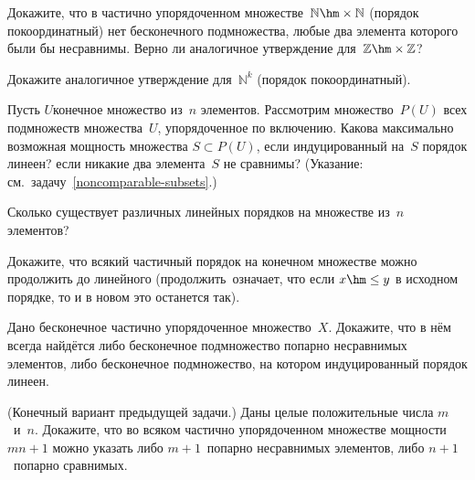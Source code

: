 \begin{problem}
Докажите, что в частично упорядоченном
множестве~$\mathbb{N}\hm\times\mathbb{N}$ (порядок покоординатный)
нет бесконечного
подмножества, любые два элемента
которого были бы несравнимы. Верно ли аналогичное
утверждение для~$\mathbb{Z}\hm\times\mathbb{Z}$?
\end{problem}

\begin{problem}
Докажите аналогичное утверждение для~$\mathbb{N}^k$ (порядок
покоординатный).
\end{problem}

\begin{problem}
Пусть $U$\т конечное множество из~$n$ элементов. Рассмотрим
множество~$P(U)$ всех подмножеств множества~$U$, упорядоченное
по включению. Какова максимально
возможная мощность множества $S\subset P(U)$, если
индуцированный на~$S$ порядок линеен? если никакие два
элемента~$S$ не сравнимы? (Указание: см.~задачу~\ref{noncomparable-subsets}.)
\end{problem}

\begin{problem}
Сколько существует различных линейных порядков на
множестве из~$n$ элементов?
\end{problem}

\begin{problem}
Докажите, что всякий частичный порядок на конечном множестве
можно продолжить до линейного ( продолжить\ означает, что
если $x\hm\le y$ в исходном порядке, то и в новом это останется
так).
\end{problem}

\begin{problem}
Дано бесконечное частично упорядоченное множество~$X$. Докажите,
что в нём всегда найдётся либо бесконечное подмножество попарно
несравнимых элементов, либо бесконечное подмножество, на котором
индуцированный порядок линеен.
\end{problem}

\begin{problem}
(Конечный вариант предыдущей задачи.) Даны целые положительные числа
$m$~и~$n$. Докажите, что во всяком частично упорядоченном множестве
мощности~$mn+1$ можно указать либо $m+1$~попарно несравнимых
элементов, либо $n+1$~попарно сравнимых.
\end{problem}

